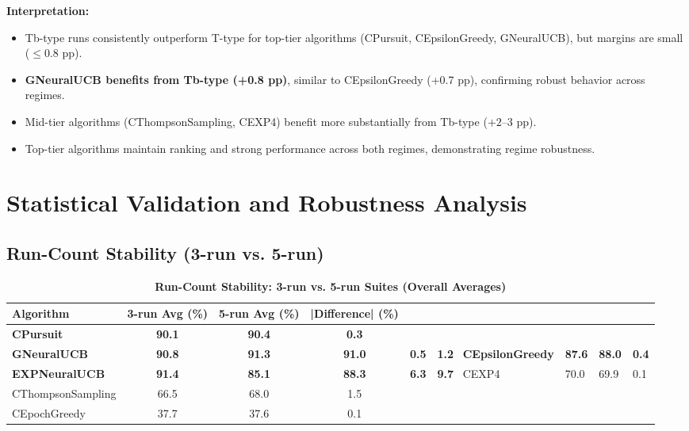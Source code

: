 \documentclass[12pt,a4paper]{article}
\newcommand{\success}[1]{\textcolor{successcolor}{\textbf{#1}}}
\newcommand{\legacy}[1]{\textcolor{legacycolor}{\textbf{#1}}}
\newcommand{\neural}[1]{\textcolor{neuralcolor}{\textbf{#1}}}
\begin{document}
\textbf{Interpretation:}
\begin{itemize}
\item Tb-type runs consistently outperform T-type for top-tier algorithms (CPursuit, CEpsilonGreedy, GNeuralUCB), but margins are small ($\leq$0.8 pp).
\item \neural{GNeuralUCB benefits from Tb-type (+0.8 pp)}, similar to CEpsilonGreedy (+0.7 pp), confirming robust behavior across regimes.
\item Mid-tier algorithms (CThompsonSampling, CEXP4) benefit more substantially from Tb-type ($+2$--3 pp).
\item Top-tier algorithms maintain ranking and strong performance across both regimes, demonstrating regime robustness.
\end{itemize}

\section{Statistical Validation and Robustness Analysis}

\subsection{Run-Count Stability (3-run vs. 5-run)}

\begin{table}[H]
\centering
\caption{\success{Run-Count Stability: 3-run vs. 5-run Suites (Overall Averages)}}
\begin{tabular}{|l|c|c|c|}
\hline
\textbf{Algorithm} & \textbf{3-run Avg (\%)} & \textbf{5-run Avg (\%)} & \textbf{|Difference| (\%)} \\
\hline
\hline
\success{CPursuit}        & \success{90.1} & \success{90.4} & \success{0.3} \\
\neural{GNeuralUCB}          & \neural{90.8} & \neural{91.3} & \neural{91.0} & \neural{0.5} & \neural{1.2} \
\success{CEpsilonGreedy} & \success{87.6} & \success{88.0} & \success{0.4} \\
\legacy{EXPNeuralUCB}          & \legacy{91.4} & \legacy{85.1} & \legacy{88.3} & \legacy{6.3} & \legacy{9.7} \
CEXP4                    & 70.0          & 69.9          & 0.1 \\
CThompsonSampling        & 66.5          & 68.0          & 1.5 \\
CEpochGreedy             & 37.7          & 37.6          & 0.1 \\
\hline
\end{tabular}
\end{table}
\end{document}
